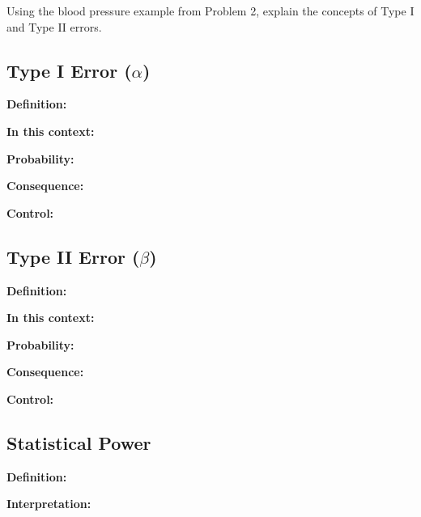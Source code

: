 \documentclass[11pt]{article}
\begin{document}
Using the blood pressure example from Problem 2, explain the concepts of Type I and Type II errors.

\subsection*{Type I Error ($\alpha$)}

\textbf{Definition:}

\vspace{1cm}

\textbf{In this context:}

\vspace{1cm}

\textbf{Probability:}

\vspace{1cm}

\textbf{Consequence:}

\vspace{3cm}

\textbf{Control:}

\vspace{1cm}

\subsection*{Type II Error ($\beta$)}

\textbf{Definition:}

\vspace{1cm}

\textbf{In this context:}

\vspace{1cm}

\textbf{Probability:}

\vspace{1cm}

\textbf{Consequence:}

\vspace{3cm}

\textbf{Control:}

\vspace{2cm}

\subsection*{Statistical Power}

\textbf{Definition:}

\vspace{1cm}

\textbf{Interpretation:}
\end{document}
